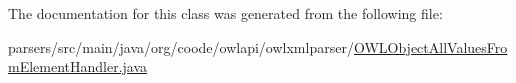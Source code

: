 The documentation for this class was generated from the following file\-:\begin{DoxyCompactItemize}
\item 
parsers/src/main/java/org/coode/owlapi/owlxmlparser/\hyperlink{_o_w_l_object_all_values_from_element_handler_8java}{O\-W\-L\-Object\-All\-Values\-From\-Element\-Handler.\-java}\end{DoxyCompactItemize}
